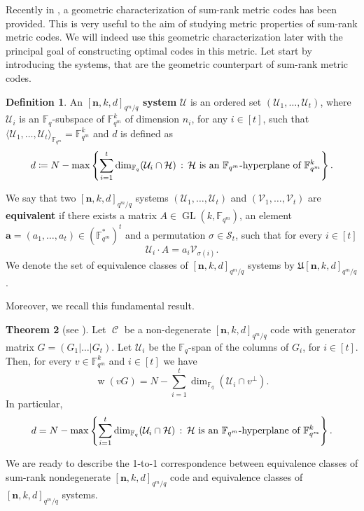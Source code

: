 \documentclass[11pt]{amsart}
\DeclareMathOperator{\C}{\mathcal{C}}
\DeclareMathOperator{\GL}{GL}
\DeclareMathOperator{\ww}{w}
\theoremstyle{definition}
\newtheorem{theorem}{Theorem}[section]
\newtheorem{definition}[theorem]{Definition}
\newcommand{\F}{{\mathbb F}}
\newcommand{\bfn}{\mathbf {n}}
\newcommand{\fq}{{\mathbb F}_{q}}
\newcommand{\Fm}{{\mathbb F}_{q^m}}
\newcommand{\Fmnkd}{[\bfn,k,d]_{q^m/q}}
\newcommand{\st}{\,:\,}
\begin{document}
Recently in \cite{neri2023geometry}, a geometric characterization of sum-rank metric codes  has been provided. 
This is very useful to the aim of studying metric properties of sum-rank metric codes. We will indeed use this geometric characterization later with the principal goal of constructing optimal codes in this metric.
Let start by introducing the systems, that are the geometric counterpart of sum-rank metric codes.


\begin{definition}
An \textbf{$\Fmnkd$ system} $\mathcal{U}$ is an ordered set $(\mathcal{U}_1,\ldots,\mathcal{U}_t)$, where $\mathcal{U}_i$ is an $\F_q$-subspace of $\F_{q^m}^k$ of dimension $n_i$, for any $i\in [t]$, such that
$ \langle \mathcal{U}_1, \ldots, \mathcal{U}_t \rangle_{\F_{q^m}}=\F_{q^m}^k$ and $d$ is defined as
$$ d\coloneqq N-\max\left\{\sum_{i=1}^t\dim_{\F_q}(\mathcal{U}_i\cap \mathcal H) \st \mathcal H \textnormal{ is an $\F_{q^m}$-hyperplane of }\F_{q^m}^k\right\}.$$
\end{definition}

We say that two $\Fmnkd$ systems $(\mathcal{U}_1,\ldots,\mathcal{U}_t)$ and $(\mathcal{V}_1,\ldots, \mathcal{V}_t)$ are \textbf{equivalent} if there exists a matrix $A\in\GL(k,\F_{q^m})$, an element $\mathbf{a}=(a_1,\ldots,a_t)\in (\Fm^*)^t$ and a permutation $\sigma\in\mathcal{S}_t$, such that for every $i\in[t]$
$$ \mathcal{U}_i \cdot A = a_i\mathcal{V}_{\sigma(i)}.$$
We denote the set of equivalence classes of $\Fmnkd$ systems by $\mathfrak{U}\Fmnkd$.

\medskip 
Moreover, we recall this fundamental result. 
\begin{theorem} [see \textnormal{\cite[Theorem 3.1]{neri2023geometry}}] \label{th:connection}
Let $\C$ be a non-degenerate $\Fmnkd$ code with generator matrix $G=(G_1|\ldots|G_t)$.
Let $\mathcal{U}_i$ be the $\F_q$-span of the columns of $G_i$, for $i\in [t]$. Then, for every $v\in \Fm^k$ and $i \in [t]$ we have
\[
\ww(v G) = N - \sum_{i=1}^t \dim_{\fq}(\mathcal{U}_i \cap v^{\perp}).
\]
In particular,
$$ d= N-\max\left\{\sum_{i=1}^t\dim_{\F_q}(\mathcal{U}_i\cap \mathcal H) \st \mathcal H \textnormal{ is an $\F_{q^m}$-hyperplane of }\F_{q^m}^k\right\}.$$
\end{theorem}




We are ready to describe the  1-to-1  correspondence  between  equivalence  classes  of  sum-rank nondegenerate $\Fmnkd$ code and equivalence classes of $\Fmnkd$ systems.
\end{document}

